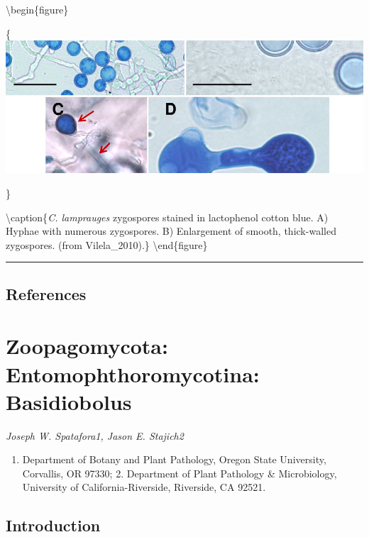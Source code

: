\documentclass[]{book}
\providecommand{\tightlist}{%
  \setlength{\itemsep}{0pt}\setlength{\parskip}{0pt}}
\begin{document}
\textbackslash begin\{figure\}

\{\centering \includegraphics[width=12.24in]{img/Ch5_Fig7}

\}

\textbackslash caption\{\emph{C. lamprauges} zygospores stained in lactophenol cotton blue. A) Hyphae with numerous zygospores. B) Enlargement of smooth, thick-walled zygospores. (from Vilela\_2010).\}\label{fig:ch5fig7}
\textbackslash end\{figure\}

\begin{center}\rule{0.5\linewidth}{\linethickness}\end{center}

\hypertarget{references-3}{%
\section{References}\label{references-3}}

\hypertarget{Basidiobolus}{%
\chapter{Zoopagomycota: Entomophthoromycotina: Basidiobolus}\label{Basidiobolus}}

\emph{Joseph W. Spatafora1, Jason E. Stajich2}

\begin{enumerate}
\def\labelenumi{\arabic{enumi}.}
\tightlist
\item
  Department of Botany and Plant Pathology, Oregon State University, Corvallis, OR 97330; 2. Department of Plant Pathology \& Microbiology, University of California-Riverside, Riverside, CA 92521.
\end{enumerate}

\hypertarget{introduction-4}{%
\section{Introduction}\label{introduction-4}}
\end{document}

